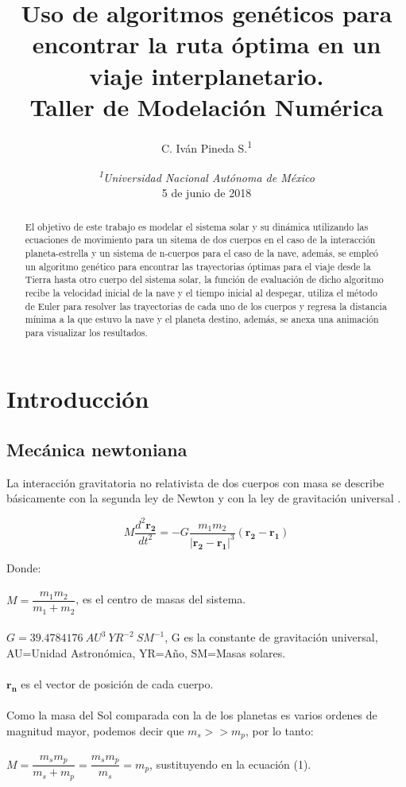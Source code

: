 \documentclass[12pt,letterpaper]{article}
\author{C. Iván Pineda S.\textsuperscript{1} }
\title{Uso de algoritmos genéticos para encontrar la ruta óptima en un viaje interplanetario.\\ Taller de Modelación Numérica}
\date {\textit{\textsuperscript{1}Universidad Nacional Autónoma de México}
\\ 5 de junio de 2018}
\begin{document}
\maketitle

\begin{abstract}
El objetivo de este trabajo es modelar el sistema solar y su dinámica utilizando las ecuaciones de movimiento para un sitema de dos cuerpos en el caso de la interacción planeta-estrella y un sistema de n-cuerpos para el caso de la nave, además, se empleó un algoritmo genético para encontrar las trayectorias óptimas para el viaje desde la Tierra hasta otro cuerpo del sistema solar, la función de evaluación de dicho algoritmo recibe la velocidad inicial de la nave y el tiempo inicial al despegar, utiliza el método de Euler para resolver las trayectorias de cada uno de los cuerpos y regresa la distancia mínima a la que estuvo la nave y el planeta destino, además, se anexa una animación para visualizar los resultados.
\end{abstract}


\section*{Introducción}

\subsection*{Mecánica newtoniana}

La interacción gravitatoria no relativista de dos cuerpos con masa se describe básicamente con la segunda ley de Newton y con la ley de gravitación universal \citep{jose2000classical}.

\begin{equation}
 M\dfrac{d ^2 \mathbf{r_2}}{d t^2}=-G\dfrac{m_1m_2}{|\mathbf{r_{2}}-\mathbf{r_1}|^3}(\mathbf{r_{2}}-\mathbf{r_1})
\end{equation} 

Donde:
\\
\\
$M=\dfrac{m_1m_2}{m_1+m_2}$, es el centro de masas del sistema.
\\
\\
$G=39.4784176 \ AU^3 \ YR^{-2} \ SM^{-1}$, G es la constante de gravitación universal, AU=Unidad Astronómica, YR=Año, SM=Masas solares.
\\
\\
$\mathbf{r_n} $ es el vector de posición de cada cuerpo.
\\
\\
Como la masa del Sol comparada con la de los planetas es varios ordenes de magnitud mayor, podemos decir que $m_s>>m_p$, por lo tanto:
\\
\\
$M=\dfrac{m_sm_p}{m_s+m_p}=\dfrac{m_sm_p}{m_s}=m_p$, sustituyendo en la ecuación (1).
\end{document}
